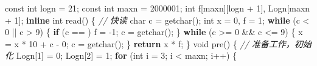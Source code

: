 \documentclass[
]{article}
\newenvironment{Shaded}{}{}
\newcommand{\AttributeTok}[1]{\textcolor[rgb]{0.49,0.56,0.16}{#1}}
\newcommand{\CharTok}[1]{\textcolor[rgb]{0.25,0.44,0.63}{#1}}
\newcommand{\CommentTok}[1]{\textcolor[rgb]{0.38,0.63,0.69}{\textit{#1}}}
\newcommand{\ControlFlowTok}[1]{\textcolor[rgb]{0.00,0.44,0.13}{\textbf{#1}}}
\newcommand{\DataTypeTok}[1]{\textcolor[rgb]{0.56,0.13,0.00}{#1}}
\newcommand{\DecValTok}[1]{\textcolor[rgb]{0.25,0.63,0.44}{#1}}
\newcommand{\KeywordTok}[1]{\textcolor[rgb]{0.00,0.44,0.13}{\textbf{#1}}}
\newcommand{\NormalTok}[1]{#1}
\newcommand{\OperatorTok}[1]{\textcolor[rgb]{0.40,0.40,0.40}{#1}}
\begin{document}
\begin{Shaded}
\begin{Highlighting}[]
\AttributeTok{const} \DataTypeTok{int}\NormalTok{ logn }\OperatorTok{=} \DecValTok{21}\OperatorTok{;}
\AttributeTok{const} \DataTypeTok{int}\NormalTok{ maxn }\OperatorTok{=} \DecValTok{2000001}\OperatorTok{;}
\DataTypeTok{int}\NormalTok{ f}\OperatorTok{[}\NormalTok{maxn}\OperatorTok{][}\NormalTok{logn }\OperatorTok{+} \DecValTok{1}\OperatorTok{],}\NormalTok{ Logn}\OperatorTok{[}\NormalTok{maxn }\OperatorTok{+} \DecValTok{1}\OperatorTok{];}
\KeywordTok{inline} \DataTypeTok{int}\NormalTok{ read}\OperatorTok{()} \OperatorTok{\{}  \CommentTok{// 快读}
  \DataTypeTok{char}\NormalTok{ c }\OperatorTok{=}\NormalTok{ getchar}\OperatorTok{();}
  \DataTypeTok{int}\NormalTok{ x }\OperatorTok{=} \DecValTok{0}\OperatorTok{,}\NormalTok{ f }\OperatorTok{=} \DecValTok{1}\OperatorTok{;}
  \ControlFlowTok{while} \OperatorTok{(}\NormalTok{c }\OperatorTok{\textless{}} \CharTok{\textquotesingle{}0\textquotesingle{}} \OperatorTok{||}\NormalTok{ c }\OperatorTok{\textgreater{}} \CharTok{\textquotesingle{}9\textquotesingle{}}\OperatorTok{)} \OperatorTok{\{}
    \ControlFlowTok{if} \OperatorTok{(}\NormalTok{c }\OperatorTok{==} \CharTok{\textquotesingle{}{-}\textquotesingle{}}\OperatorTok{)}\NormalTok{ f }\OperatorTok{=} \OperatorTok{{-}}\DecValTok{1}\OperatorTok{;}
\NormalTok{    c }\OperatorTok{=}\NormalTok{ getchar}\OperatorTok{();}
  \OperatorTok{\}}
  \ControlFlowTok{while} \OperatorTok{(}\NormalTok{c }\OperatorTok{\textgreater{}=} \CharTok{\textquotesingle{}0\textquotesingle{}} \OperatorTok{\&\&}\NormalTok{ c }\OperatorTok{\textless{}=} \CharTok{\textquotesingle{}9\textquotesingle{}}\OperatorTok{)} \OperatorTok{\{}
\NormalTok{    x }\OperatorTok{=}\NormalTok{ x }\OperatorTok{*} \DecValTok{10} \OperatorTok{+}\NormalTok{ c }\OperatorTok{{-}} \CharTok{\textquotesingle{}0\textquotesingle{}}\OperatorTok{;}
\NormalTok{    c }\OperatorTok{=}\NormalTok{ getchar}\OperatorTok{();}
  \OperatorTok{\}}
  \ControlFlowTok{return}\NormalTok{ x }\OperatorTok{*}\NormalTok{ f}\OperatorTok{;}
\OperatorTok{\}}
\DataTypeTok{void}\NormalTok{ pre}\OperatorTok{()} \OperatorTok{\{}  \CommentTok{// 准备工作，初始化}
\NormalTok{  Logn}\OperatorTok{[}\DecValTok{1}\OperatorTok{]} \OperatorTok{=} \DecValTok{0}\OperatorTok{;}
\NormalTok{  Logn}\OperatorTok{[}\DecValTok{2}\OperatorTok{]} \OperatorTok{=} \DecValTok{1}\OperatorTok{;}
  \ControlFlowTok{for} \OperatorTok{(}\DataTypeTok{int}\NormalTok{ i }\OperatorTok{=} \DecValTok{3}\OperatorTok{;}\NormalTok{ i }\OperatorTok{\textless{}}\NormalTok{ maxn}\OperatorTok{;}\NormalTok{ i}\OperatorTok{++)} \OperatorTok{\{}

\end{Highlighting}
\end{Shaded}
\end{document}
